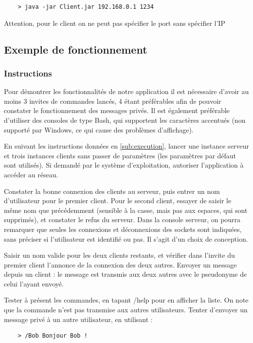 \documentclass[10pt,a4paper]{article}
\begin{document}
	\begin{verbatim}
	> java -jar Client.jar 192.168.0.1 1234
	\end{verbatim}
	
	Attention, pour le client on ne peut pas spécifier le port sans spécifier l'IP
	
	\subsection{Exemple de fonctionnement}
	
	\subsubsection{Instructions}
	
	Pour démontrer les fonctionnalités de notre application il est nécessaire d'avoir au moins 3 invites de commandes lancés, 4 étant préférables afin de pouvoir constater le fonctionnement des messages privés. Il est également préférable d'utiliser des consoles de type Bash, qui supportent les caractères accentués (non supporté par Windows, ce qui cause des problèmes d'affichage).
	
	En suivant les instructions données en \ref{sub:execution}, lancer une instance serveur et trois instances clients sans passer de paramètres (les paramètres par défaut sont utilisés). Si demandé par le système d'exploitation, autoriser l'application à accéder au réseau.
	
	Constater la bonne connexion des clients au serveur, puis entrer un nom d'utilisateur pour le premier client. Pour le second client, essayer de saisir le même nom que précédemment (sensible à la casse, mais pas aux espaces, qui sont supprimés), et constater le refus du serveur. Dans la console serveur, on pourra remarquer que seules les connexions et déconnexions des sockets sont indiquées, sans préciser si l'utilisateur est identifié ou pas. Il s'agit d'un choix de conception.
	
	Saisir un nom valide pour les deux clients restants, et vérifier dans l'invite du premier client l'annonce de la connexion des deux autres. Envoyer un message depuis un client : le message est transmis aux deux autres avec le pseudonyme de celui l'ayant envoyé.
	
	Tester à présent les commandes, en tapant /help pour en afficher la liste. On note que la commande n'est pas transmise aux autres utilisateurs. Tenter d'envoyer un message privé à un autre utilisateur, en utilisant :
	\begin{verbatim}
	> /Bob Bonjour Bob !
	\end{verbatim}
	
\end{document}
